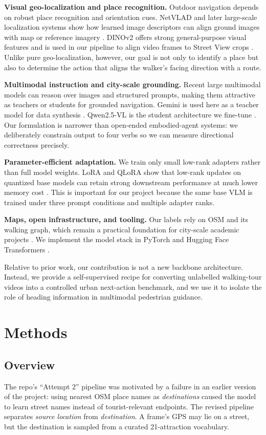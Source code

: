 \documentclass[10pt,twocolumn,letterpaper]{article}
\begin{document}
\textbf{Visual geo-localization and place recognition.} Outdoor navigation depends on robust place recognition and orientation cues. NetVLAD and later large-scale localization systems show how learned image descriptors can align ground images with map or reference imagery \cite{arandjelovic2016netvlad,sarlin2019coarse}. DINOv2 offers strong general-purpose visual features and is used in our pipeline to align video frames to Street View crops \cite{oquab2023dinov2}. Unlike pure geo-localization, however, our goal is not only to identify a place but also to determine the action that aligns the walker's facing direction with a route.

\textbf{Multimodal instruction and city-scale grounding.} Recent large multimodal models can reason over images and structured prompts, making them attractive as teachers or students for grounded navigation. Gemini is used here as a teacher model for data synthesis \cite{gemini2024}. Qwen2.5-VL is the student architecture we fine-tune \cite{qwen25vl2025}. Our formulation is narrower than open-ended embodied-agent systems: we deliberately constrain output to four verbs so we can measure directional correctness precisely.

\textbf{Parameter-efficient adaptation.} We train only small low-rank adapters rather than full model weights. LoRA and QLoRA show that low-rank updates on quantized base models can retain strong downstream performance at much lower memory cost \cite{hu2022lora,dettmers2023qlora}. This is important for our project because the same base VLM is trained under three prompt conditions and multiple adapter ranks.

\textbf{Maps, open infrastructure, and tooling.} Our labels rely on OSM and its walking graph, which remain a practical foundation for city-scale academic projects \cite{haklay2008openstreetmap}. We implement the model stack in PyTorch and Hugging Face Transformers \cite{paszke2019pytorch,wolf2020transformers}.

Relative to prior work, our contribution is not a new backbone architecture. Instead, we provide a self-supervised recipe for converting unlabelled walking-tour videos into a controlled urban next-action benchmark, and we use it to isolate the role of heading information in multimodal pedestrian guidance.

\section{Methods}
\subsection{Overview}
The repo's ``Attempt 2'' pipeline was motivated by a failure in an earlier version of the project: using nearest OSM place names as \textit{destinations} caused the model to learn street names instead of tourist-relevant endpoints. The revised pipeline separates \textit{source location} from \textit{destination}. A frame's GPS may lie on a street, but the destination is sampled from a curated 21-attraction vocabulary.
\end{document}
